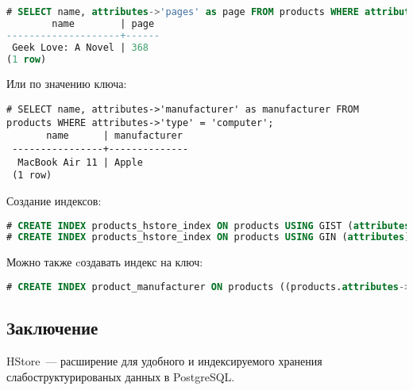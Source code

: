 \begin{lstlisting}[language=SQL,label=lst:hstore4,caption=Поиск по ключу]
# SELECT name, attributes->'pages' as page FROM products WHERE attributes ? 'pages';
        name        | page
--------------------+------
 Geek Love: A Novel | 368
(1 row)
\end{lstlisting}

Или по значению ключа:
\begin{lstlisting}[label=lst:hstore5,caption=Поиск по значению ключа]
# SELECT name, attributes->'manufacturer' as manufacturer FROM products WHERE attributes->'type' = 'computer';
       name      | manufacturer
 ----------------+--------------
  MacBook Air 11 | Apple
 (1 row)
\end{lstlisting}

Создание индексов:

\begin{lstlisting}[language=SQL,label=lst:hstore6,caption=Индексы]
# CREATE INDEX products_hstore_index ON products USING GIST (attributes);
# CREATE INDEX products_hstore_index ON products USING GIN (attributes);
\end{lstlisting}

Можно также cоздавать индекс на ключ:

\begin{lstlisting}[language=SQL,label=lst:hstore7,caption=Индекс на ключ]
# CREATE INDEX product_manufacturer ON products ((products.attributes->'manufacturer'));
\end{lstlisting}

\subsection{Заключение}

HStore~--- расширение для удобного и индексируемого хранения слабоструктурированых данных в PostgreSQL.